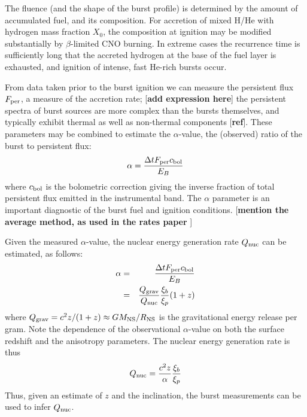\documentclass{aastex63}
\begin{document}
The fluence (and the shape of the burst profile) is determined by the amount of accumulated fuel, and its composition. For accretion of mixed H/He with hydrogen mass fraction $X_0$, the composition at ignition may be modified substantially by $\beta$-limited CNO burning. In extreme cases the recurrence time is sufficiently long that the accreted hydrogen at the base of the fuel layer is exhausted, and ignition of intense, fast He-rich bursts occur.

From data taken prior to the burst ignition we can measure the persistent flux $F_{\rm per}$, a measure of the accretion rate; [{\bf add expression here}]
the persistent spectra of burst sources are  more complex than the bursts themselves, and typically exhibit thermal as well as non-thermal components [{\bf ref}].
%
These parameters may be combined to estimate the $\alpha$-value, the (observed) ratio of the burst to persistent flux: 
\begin{equation}
\alpha = \frac{\Delta t F_{\rm per} c_{\rm bol}}{E_B}
\end{equation}
where $c_{\rm bol}$ is the bolometric correction giving the inverse fraction of total persistent flux emitted in the instrumental band.
%
The $\alpha$ parameter is an important diagnostic of the burst fuel and ignition conditions.
%
[{\bf mention the average method, as used in the rates paper }]

Given the measured $\alpha$-value, the nuclear energy generation rate $Q_{\rm nuc}$ can be estimated, as follows:
\begin{eqnarray}
\alpha & = & \frac{\Delta t F_{\rm per} c_{\rm bol}}{E_B} \\
& = & \frac{Q_{\rm grav}}{Q_{\rm nuc}}\frac{\xi_b}{\xi_p}(1+z)
\end{eqnarray}
where $Q_{\rm grav} = c^2z/(1+z) \approx GM_{\rm NS}/R_{\rm NS}$ is the gravitational energy release per gram. Note the dependence of the observational $\alpha$-value on both the surface redshift and the anisotropy parameters. The nuclear energy generation rate is thus
\begin{equation}
Q_{\rm nuc} = \frac{c^2 z}{\alpha}\frac{\xi_b}{\xi_p} \label{qnuc}
\end{equation}
Thus, given an estimate of $z$ and the inclination, the burst measurements can be used to infer $Q_{\rm nuc}$. 
\end{document}
